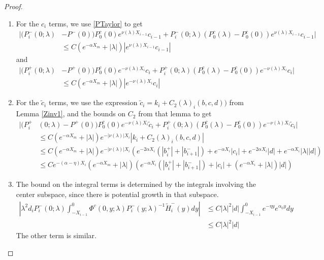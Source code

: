 \documentclass[thesis.tex]{subfiles}
\begin{document}
\begin{lemma}
\begin{proof}
\begin{enumerate}
\item For the $c_i$ terms, we use \eqref{PTaylor} to get
\begin{align*}
|(P_i^-(0; \lambda) &- P^-(0)) P_0^c(0) e^{\nu(\lambda) X_{i-1}} c_{i-1} + P_i^-(0; \lambda) (P_0^c(\lambda) - P_0^c(0)) e^{\nu(\lambda) X_{i-1}} c_{i-1} | \\
&\leq C (e^{-\alpha X_m} + |\lambda|)|e^{\nu(\lambda) X_{i-1}} c_{i-1}|
\end{align*}
and
\begin{align*}
|(P_i^+(0; \lambda) &- P^+(0))P_0^c(0) e^{-\nu(\lambda)X_i} c_i + P_i^+(0; \lambda) (P_0^c(\lambda) - P_0^c(0)) e^{-\nu(\lambda)X_i} c_i| \\
&\leq C (e^{-\alpha X_m} + |\lambda|)|e^{-\nu(\lambda)X_i} c_i|
\end{align*}

\item For the $\tilde{c}_i$ terms, we use the expression $\tilde{c}_i = k_i + C_2(\lambda)_i(b, c, d) )$ from Lemma \ref{Zinv1}, and the bounds on $C_2$ from that lemma to get
\begin{align*}
|(P_i^+&(0; \lambda) - P^+(0))P_0^c(0) e^{-\nu(\lambda)X_i} \tilde{c}_i + P_i^+(0; \lambda) (P_0^c(\lambda) - P_0^c(0)) e^{-\nu(\lambda)X_i} \tilde{c}_i| \\
&\leq C (e^{-\alpha X_m} + |\lambda|)e^{-|\nu(\lambda)|X_i} |k_i + C_2(\lambda)_i(b, c, d) | \\
&\leq C (e^{-\alpha X_m} + |\lambda|) e^{-|\nu(\lambda)|X_i} \left( e^{-2 \alpha X_i} (|b_i^+| + |b_{i+1}^-|) + e^{-\alpha X_i}|c_i| + e^{-2 \alpha X_i}|d| + e^{-\alpha X_i}|\lambda||d| \right) \\
&\leq C e^{-(\alpha - \eta)X_i} (e^{-\alpha X_m} + |\lambda|) ( e^{-\alpha X_i}( |b_i^+| + |b_{i+1}^-|) + |c_i| + (e^{-\alpha X_i} + |\lambda|)|d| )
\end{align*}

\item The bound on the integral terms is determined by the integrals involving the center subspace, since there is potential growth in that subspace.
\begin{align*}
\left| \lambda^2 d_i P_i^-(0; \lambda) \int_{-X_{i-1}}^0 \Phi^c(0, y; \lambda) P_i^-(y; \lambda)^{-1} \tilde{H}_i^-(y) dy \right| &\leq C |\lambda|^2 |d| \int_{-X_{i-1}}^0 e^{-\eta y} e^{\alpha_0 y} dy \\
&\leq C |\lambda|^2 |d|
\end{align*}
The other term is similar.
\end{enumerate}


\end{proof}
\end{lemma}
\end{document}
